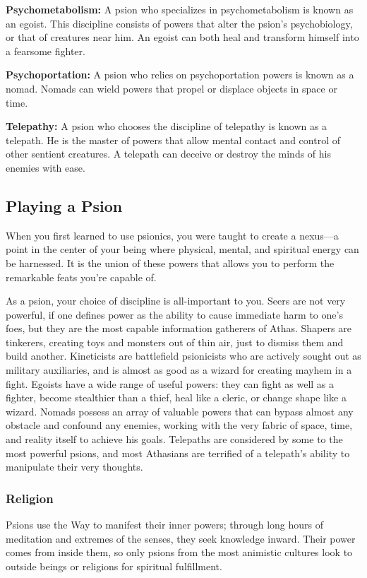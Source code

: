 \textbf{Psychometabolism:} A psion who specializes in psychometabolism is known as an egoist. This discipline consists of powers that alter the psion's psychobiology, or that of creatures near him. An egoist can both heal and transform himself into a fearsome fighter.

\textbf{Psychoportation:} A psion who relies on psychoportation powers is known as a nomad. Nomads can wield powers that propel or displace objects in space or time.

\textbf{Telepathy:} A psion who chooses the discipline of telepathy is known as a telepath. He is the master of powers that allow mental contact and control of other sentient creatures. A telepath can deceive or destroy the minds of his enemies with ease.

\subsection{Playing a Psion}
When you first learned to use psionics, you were taught to create a nexus---a point in the center of your being where physical, mental, and spiritual energy can be harnessed. It is the union of these powers that allows you to perform the remarkable feats you're capable of.

As a psion, your choice of discipline is all-important to you. Seers are not very powerful, if one defines power as the ability to cause immediate harm to one's foes, but they are the most capable information gatherers of Athas. Shapers are tinkerers, creating toys and monsters out of thin air, just to dismiss them and build another. Kineticists are battlefield psionicists who are actively sought out as military auxiliaries, and is almost as good as a wizard for creating mayhem in a fight. Egoists have a wide range of useful powers: they can fight as well as a fighter, become stealthier than a thief, heal like a cleric, or change shape like a wizard. Nomads possess an array of valuable powers that can bypass almost any obstacle and confound any enemies, working with the very fabric of space, time, and reality itself to achieve his goals. Telepaths are considered by some to the most powerful psions, and most Athasians are terrified of a telepath's ability to manipulate their very thoughts.

\subsubsection{Religion}
Psions use the Way to manifest their inner powers; through long hours of meditation and extremes of the senses, they seek knowledge inward. Their power comes from inside them, so only psions from the most animistic cultures look to outside beings or religions for spiritual fulfillment.

